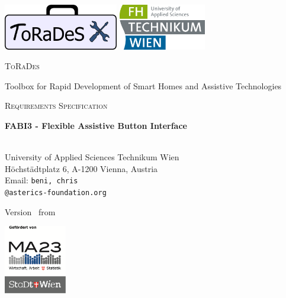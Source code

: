 \documentclass[]{scrreprt}%
\newcommand{\docTitle}{FABI3 - Flexible Assistive Button Interface}
\newcommand{\BAEmail}{beni}
\newcommand{\CVEmail}{chris}
\begin{document}
% 
% 
% 

\begin{titlepage}
	
	\includegraphics[height=20mm]{logo.png} \hfill
	\includegraphics[height=20mm]{fhtw.png}
	
	\centering
	\par\vspace{1cm}
	{\scshape\Huge ToRaDes \normalsize \par Toolbox for Rapid Development of Smart Homes and Assistive Technologies \par}
	\vspace{1cm}
	{\scshape\Large Requirements Specification\par}
	\vspace{1.5cm}
	{\huge\bfseries \docTitle \par}
	\vspace{2cm}
	{\Large
	\vhListAllAuthorsLongWithAbbrev \\{University of Applied Sciences Technikum Wien}
	\\{H\"ochst\"adtplatz 6, A-1200 Vienna, Austria}
	\\{Email: {\texttt{\BAEmail, \CVEmail}}}
	\\{\texttt{@asterics-foundation.org}}
	\par}
	\vfill
	{\large Version \vhCurrentVersion\ from \vhCurrentDate \par}
	\begin{flushright}
	 \includegraphics[height=30mm]{ma23.png}
	\end{flushright}
\end{titlepage}
\end{document}

